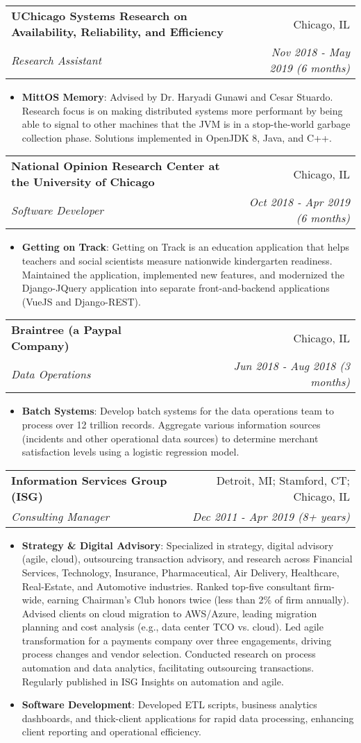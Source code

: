 \documentclass[letterpaper,11pt]{article}
\makeatletter
\newcommand{\resumeItem}[2]{
  \item\small{
    \textbf{#1}{: #2 \vspace{-2pt}}
  }
}
\newcommand{\resumeSubheading}[4]{
  \vspace{-1pt}\item
    \begin{tabular*}{0.97\textwidth}[t]{l@{\extracolsep{\fill}}r}
      \textbf{#1} & #2 \\
      \textit{\small#3} & \textit{\small #4} \\
    \end{tabular*}\vspace{-5pt}
}
\newcommand{\resumeItemListStart}{\begin{itemize}}
\newcommand{\resumeItemListEnd}{\end{itemize}\vspace{-5pt}}
\makeatother
\begin{document}
    \resumeSubheading
      {UChicago Systems Research on Availability, Reliability, and Efficiency}{Chicago, IL}
      {Research Assistant}{Nov 2018 - May 2019 (6 months)}
      \resumeItemListStart
        \resumeItem{MittOS Memory}
          {Advised by Dr. Haryadi Gunawi and Cesar Stuardo. Research focus is on making distributed systems more performant by being able to signal to other machines that the JVM is in a stop-the-world garbage collection phase. Solutions implemented in OpenJDK 8, Java, and C++.}
      \resumeItemListEnd

    \resumeSubheading
      {National Opinion Research Center at the University of Chicago}{Chicago, IL}
      {Software Developer}{Oct 2018 - Apr 2019 (6 months)}
      \resumeItemListStart
        \resumeItem{Getting on Track}
          {Getting on Track is an education application that helps teachers and social scientists measure nationwide kindergarten readiness. Maintained the application, implemented new features, and modernized the Django-JQuery application into separate front-and-backend applications (VueJS and Django-REST).}
      \resumeItemListEnd

    \resumeSubheading
      {Braintree (a Paypal Company)}{Chicago, IL}
      {Data Operations}{Jun 2018 - Aug 2018 (3 months)}
      \resumeItemListStart
        \resumeItem{Batch Systems}
          {Develop batch systems for the data operations team to process over 12 trillion records. Aggregate various information sources (incidents and other operational data sources) to determine merchant satisfaction levels using a logistic regression model.}
      \resumeItemListEnd

    \resumeSubheading
      {Information Services Group (ISG)}{Detroit, MI; Stamford, CT; Chicago, IL}
      {Consulting Manager}{Dec 2011 - Apr 2019 (8+ years)}
      \resumeItemListStart
        \resumeItem{Strategy \& Digital Advisory}
          {Specialized in strategy, digital advisory (agile, cloud), outsourcing transaction advisory, and research across Financial Services, Technology, Insurance, Pharmaceutical, Air Delivery, Healthcare, Real-Estate, and Automotive industries. Ranked top-five consultant firm-wide, earning Chairman’s Club honors twice (less than 2\% of firm annually). Advised clients on cloud migration to AWS/Azure, leading migration planning and cost analysis (e.g., data center TCO vs. cloud). Led agile transformation for a payments company over three engagements, driving process changes and vendor selection. Conducted research on process automation and data analytics, facilitating outsourcing transactions. Regularly published in ISG Insights on automation and agile.}
        \resumeItem{Software Development}
          {Developed ETL scripts, business analytics dashboards, and thick-client applications for rapid data processing, enhancing client reporting and operational efficiency.}
      \resumeItemListEnd
\end{document}
